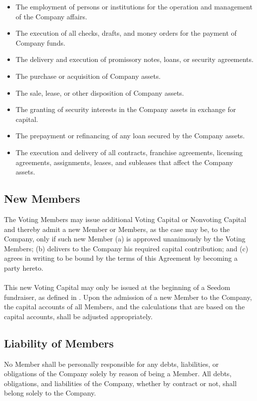 \documentclass[11pt]{article}
\begin{document}
\begin{itemize}
\item The employment of persons or institutions for the operation and management of the Company affairs.
\item The execution of all checks, drafts, and money orders for the payment of Company funds.
\item The delivery and execution of promissory notes, loans, or security agreements.
\item The purchase or acquisition of Company assets.
\item The sale, lease, or other disposition of Company assets.
\item The granting of security interests in the Company assets in exchange for capital.
\item The prepayment or refinancing of any loan secured by the Company assets.
\item The execution and delivery of all contracts, franchise agreements, licensing agreements, assignments, leases, and subleases that affect the Company assets.\\
\end{itemize}

\subsection{New Members}
The Voting Members may issue additional Voting Capital or Nonvoting Capital and thereby admit a new Member or Members, as the case may be, to the Company, only if such new Member (a) is approved unanimously by the Voting Members; (b) delivers to the Company his required capital contribution; and (c) agrees in writing to be bound by the terms of this Agreement by becoming a party hereto.\\\\
This new Voting Capital may only be issued at the beginning of a Seedom fundraiser, as defined in . Upon the admission of a new Member to the Company, the capital accounts of all Members, and the calculations that are based on the capital accounts, shall be adjusted appropriately.

\subsection{Liability of Members}
No Member shall be personally responsible for any debts, liabilities, or obligations of the Company solely by reason of being a Member. All debts, obligations, and liabilities of the Company, whether by contract or not, shall belong solely to the Company.
\end{document}
